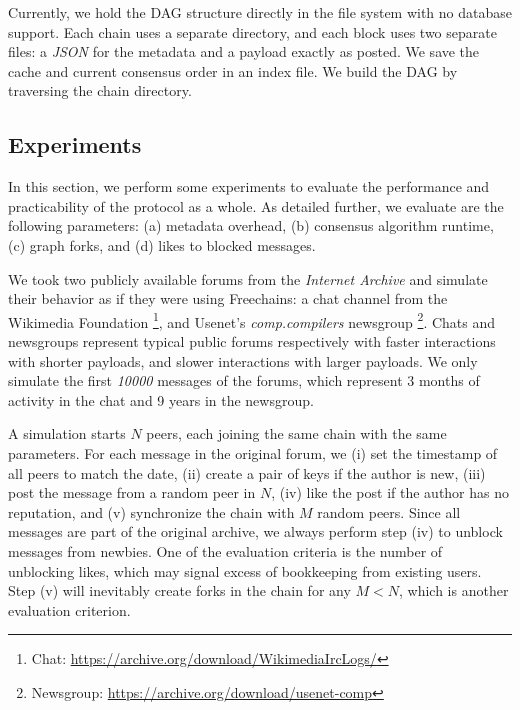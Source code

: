 \documentclass[10pt,journal,compsoc]{IEEEtran}
\newcommand{\FC}       {Freechains\xspace}
\begin{document}
Currently, we hold the DAG structure directly in the file system with no
database support.
Each chain uses a separate directory, and each block uses two separate files:
a \emph{JSON} for the metadata and a payload exactly as posted.
We save the cache and current consensus order in an index file.
We build the DAG by traversing the chain directory.

\subsection{Experiments}
\label{sec.consensus.eval}

In this section, we perform some experiments to evaluate the performance and
practicability of the protocol as a whole.
%
As detailed further, we evaluate are the following parameters:
    (a) metadata overhead,
    (b) consensus algorithm runtime,
    (c) graph forks, and
    (d) likes to blocked messages.

We took two publicly available forums from the \emph{Internet Archive} and
simulate their behavior as if they were using \FC:
%
    a chat channel from the Wikimedia Foundation%
\footnote{ Chat: \url{https://archive.org/download/WikimediaIrcLogs/} }, and
    Usenet's \emph{comp.compilers} newsgroup%
\footnote{ Newsgroup: \url{https://archive.org/download/usenet-comp} }.
%
Chats and newsgroups represent typical public forums respectively with
    faster interactions with shorter payloads, and
    slower interactions with larger payloads.
%
We only simulate the first \emph{10000} messages of the forums, which
represent 3 months of activity in the chat and 9 years in the newsgroup.

A simulation starts $N$ peers, each joining the same chain with the same
parameters.
For each message in the original forum, we
    (i)   set the timestamp of all peers to match the date,
    (ii)  create a pair of keys if the author is new,
    (iii) post the message from a random peer in $N$,
    (iv)  like the post if the author has no reputation, and
    (v)   synchronize the chain with $M$ random peers.
%
Since all messages are part of the original archive, we always perform step
(iv) to unblock messages from newbies.
One of the evaluation criteria is the number of unblocking likes, which may
signal excess of bookkeeping from existing users.
Step (v) will inevitably create forks in the chain for any $M<N$, which is
another evaluation criterion.
\end{document}
